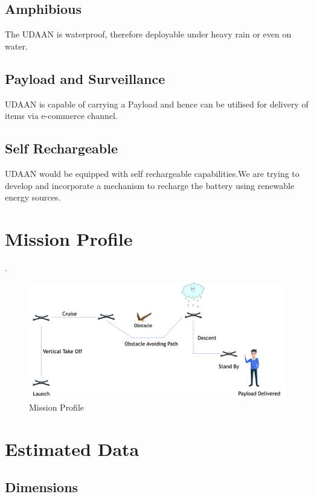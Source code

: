 \subsection{Amphibious}

The UDAAN is waterproof, therefore deployable under heavy rain or even on water.

\subsection{Payload and Surveillance}

UDAAN is capable of carrying a Payload and hence can be utilised for delivery of items via e-commerce channel.


\subsection{Self Rechargeable}

UDAAN would be equipped with self rechargeable capabilities.We are trying to develop and incorporate a mechanism to recharge the battery using renewable energy sources. 




\clearpage
\section{Mission Profile} .

\begin{figure}[h!]
\centering
\includegraphics[width=1.1\textwidth]{mission_profile.png} 
\caption{\label{fig:mission_profile}Mission Profile}
\end{figure}


\section{Estimated Data}

\subsection{Dimensions}

